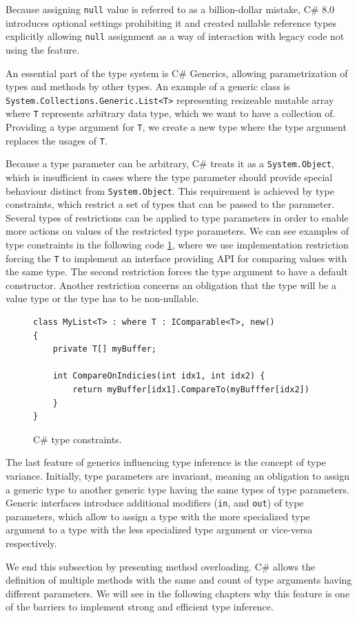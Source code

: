 Because assigning \texttt{null} value is referred to as a billion-dollar mistake, C\# 8.0 introduces optional settings prohibiting it and created nullable reference types explicitly allowing \texttt{null} assignment as a way of interaction with legacy code not using the feature.
\par
{}
An essential part of the type system is C\# Generics, allowing parametrization of types and methods by other types. 
An example of a generic class is \texttt{System.Collections.Generic.List<T>} representing resizeable mutable array where  \texttt{T} represents arbitrary data type, which we want to have a collection of. 
Providing a type argument for  \texttt{T}, we create a new type where the type argument replaces the usages of  \texttt{T}.
\par
{}
Because a type parameter can be arbitrary, C\# treats it as a \texttt{System.Object}, which is insufficient in cases where the type parameter should provide special behaviour distinct from \texttt{System.Object}.
This requirement is achieved by type constraints, which restrict a set of types that can be passed to the parameter.
Several types of restrictions can be applied to type parameters in order to enable more actions on values of the restricted type parameters.
We can see examples of type constraints in the following code \ref{img05:typeConst}, where we use implementation restriction forcing the \texttt{T} to implement an interface providing API for comparing values with the same type.
The second restriction forces the type argument to have a default constructor.
Another restriction concerns an obligation that the type will be a value type or the type has to be non-nullable.
\par
\begin{figure}
\begin{lstlisting}[style=csharp]
class MyList<T> : where T : IComparable<T>, new()
{  
	private T[] myBuffer;
	
	int CompareOnIndicies(int idx1, int idx2) {
		return myBuffer[idx1].CompareTo(myBufffer[idx2])	
	}
}
\end{lstlisting}
\caption{C\# type constraints.}
\label{img05:typeConst}
\end{figure}
\par
{}
The last feature of generics influencing type inference is the concept of type variance.
Initially, type parameters are invariant, meaning an obligation to assign a generic type to another generic type having the same types of type parameters.
Generic interfaces introduce additional modifiers (\texttt{in}, and \texttt{out}) of type parameters, which allow to assign a type with the more specialized type argument to a type with the less specialized type argument or vice-versa respectively.
\par
{}
We end this subsection by presenting method overloading. 
C\# allows the definition of multiple methods with the same and count of type arguments having different parameters. 
We will see in the following chapters why this feature is one of the barriers to implement strong and efficient type inference.

